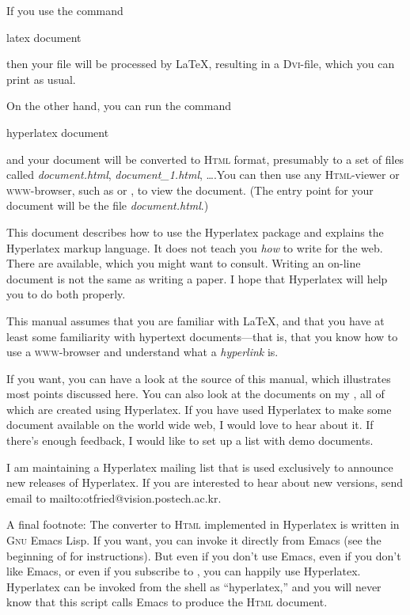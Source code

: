 \documentclass[a4paper]{article}
\newcommand{\+}{\verb+}
\renewcommand{\=}{\back{}}
\newcommand{\Html}{\textsc{Html}\xspace }
\newcommand{\latex}{\LaTeX\xspace }
\newcommand{\dvi}{\textsc{Dvi}\xspace }
\begin{document}
If you use the command
\begin{example}
  latex document
\end{example}
then your file will be processed by \latex, resulting in a
\dvi-file, which you can print as usual.

On the other hand, you can run the command
\begin{example}
  hyperlatex document
\end{example}
and your document will be converted to \Html format, presumably to a
set of files called \textit{document.html}, \textit{document\_1.html},
\ldots{}.You can then use any \Html-viewer or \textsc{www}-browser,
such as  or , to view the document.
(The entry point for your document will be the file
\textit{document.html}.)

This document describes how to use the Hyperlatex package and explains
the Hyperlatex markup language. It does not teach you {\em how} to
write for the web. There are 
available, which you might want to consult. Writing an on-line
document is not the same as writing a paper. I hope that Hyperlatex
will help you to do both properly.

This manual assumes that you are familiar with \latex, and that you
have at least some familiarity with hypertext documents---that is,
that you know how to use a \textsc{www}-browser and understand what a
\emph{hyperlink} is.

If you want, you can have a look at the source of this manual, which
illustrates most points discussed here. You can also look at the
documents on my , all of which are created
using Hyperlatex.  If you have used Hyperlatex to make some document
available on the world wide web, I would love to hear about it. If
there's enough feedback, I would like to set up a list with demo
documents.

I am maintaining a Hyperlatex mailing list that is used exclusively to
announce new releases of Hyperlatex.  If you are interested to hear
about new versions, send email to
{mailto:otfried@vision.postech.ac.kr}.

A final footnote: The converter to \Html implemented in Hyperlatex
is written in \textsc{Gnu} Emacs Lisp. If you want, you can invoke it
directly from Emacs (see the beginning of  for
instructions). But even if you don't use Emacs, even if you don't like
Emacs, or even if you subscribe to ,
you can happily use Hyperlatex.  Hyperlatex can be invoked from the
shell as ``hyperlatex,'' and you will never know that this script
calls Emacs to produce the \Html document.
\end{document}
